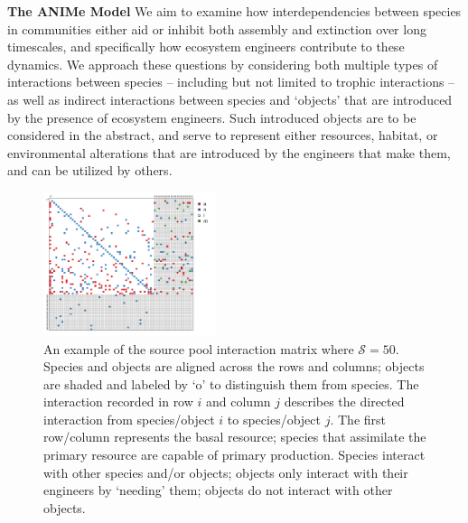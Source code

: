 \documentclass[twocolumn,preprintnumbers,amsmath,amssymb,superscriptaddress]{revtex4}
\begin{document}
\textbf{The ANIMe Model} We aim to examine how interdependencies between species in communities either aid or inhibit both assembly and extinction over long timescales, and specifically how ecosystem engineers contribute to these dynamics.
We approach these questions by considering both multiple types of interactions between species -- including but not limited to trophic interactions --  as well as indirect interactions between species and `objects' that are introduced by the presence of ecosystem engineers.
Such introduced objects are to be considered in the abstract, and serve to represent either resources, habitat, or environmental alterations that are introduced by the engineers that make them, and can be utilized by others. 


\begin{figure}
\centering
\includegraphics[width=0.45\textwidth]{matrix.pdf}
\caption{
An example of the source pool interaction matrix where $\mathcal{S} = 50$. Species and objects are aligned across the rows and columns; objects are shaded and labeled by `o' to distinguish them from species. The interaction recorded in row $i$ and column $j$ describes the directed interaction from species/object $i$ to species/object $j$. The first row/column represents the basal resource; species that assimilate the primary resource are capable of primary production. Species interact with other species and/or objects; objects only interact with their engineers by `needing' them; objects do not interact with other objects.
}
\label{fig:matrix}
\end{figure} 
\end{document}
